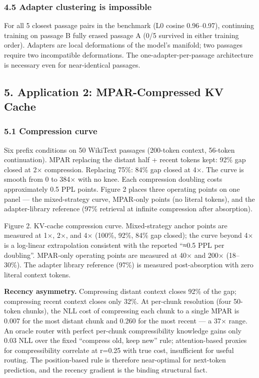 \subsubsection{4.5 Adapter clustering is impossible}\label{adapter-clustering-is-impossible}

For all 5 closest passage pairs in the benchmark (L0 cosine 0.96--0.97), continuing training on passage B fully erased passage A (0/5 survived in either training order). Adapters are local deformations of the model's manifold; two passages require two incompatible deformations. The one-adapter-per-passage architecture is necessary even for near-identical passages.

\subsection{5. Application 2: MPAR-Compressed KV Cache}\label{application-2-mpar-compressed-kv-cache}

\subsubsection{5.1 Compression curve}\label{compression-curve}

Six prefix conditions on 50 WikiText passages (200-token context, 56-token continuation). MPAR replacing the distant half + recent tokens kept: 92\% gap closed at 2× compression. Replacing 75\%: 84\% gap closed at 4×. The curve is smooth from 0 to 384× with no knee. Each compression doubling costs approximately 0.5 PPL points. Figure 2 places three operating points on one panel --- the mixed-strategy curve, MPAR-only points (no literal tokens), and the adapter-library reference (97\% retrieval at infinite compression after absorption).

Figure 2. KV-cache compression curve. Mixed-strategy anchor points are measured at 1×, 2×, and 4× (100\%, 92\%, 84\% gap closed); the curve beyond 4× is a log-linear extrapolation consistent with the reported ``≈0.5 PPL per doubling''. MPAR-only operating points are measured at 40× and 200× (18--30\%). The adapter library reference (97\%) is measured post-absorption with zero literal context tokens.

\textbf{Recency asymmetry.} Compressing distant context closes 92\% of the gap; compressing recent context closes only 32\%. At per-chunk resolution (four 50-token chunks), the NLL cost of compressing each chunk to a single MPAR is 0.007 for the most distant chunk and 0.260 for the most recent --- a 37× range. An oracle router with perfect per-chunk compressibility knowledge gains only 0.03 NLL over the fixed ``compress old, keep new'' rule; attention-based proxies for compressibility correlate at r=0.25 with true cost, insufficient for useful routing. The position-based rule is therefore near-optimal for next-token prediction, and the recency gradient is the binding structural fact.

